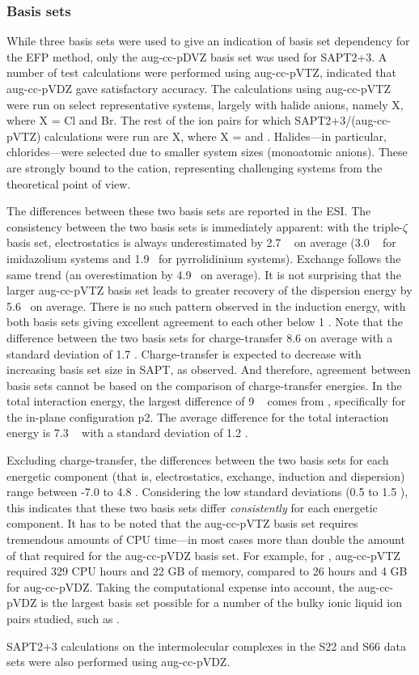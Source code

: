 \subsubsection{Basis sets}
While three basis sets were used to give an indication of basis set dependency for the EFP method, only the aug-cc-pDVZ basis set was used for SAPT2+3. 
A number of test calculations were performed using aug-cc-pVTZ, indicated that aug-cc-pVDZ gave satisfactory accuracy.
The calculations using aug-cc-pVTZ were run on select representative systems, largely with halide anions, namely X, where X = Cl and Br.
The rest of the ion pairs for which SAPT2+3/(aug-cc-pVTZ) calculations were run are X, where X = \bfl and \cl.
Halides---in particular, chlorides---were selected due to smaller system sizes (monoatomic anions). 
These are strongly bound to the cation, representing challenging systems from the theoretical point of view.
\cite{Lehmann2010a}


The differences between these two basis sets are reported in the ESI.
The consistency between the two basis sets is immediately apparent: with the triple-$\zeta$ basis set, electrostatics is always underestimated by 2.7 \enUnit~ on average (3.0 \enUnit~ for imidazolium systems and 1.9 \enUnit~for pyrrolidinium systems). 
Exchange follows the same trend (an overestimation by 4.9 \enUnit~on average).
It is not surprising that the larger aug-cc-pVTZ basis set leads to greater recovery of the dispersion energy by 5.6 \enUnit~on average.
There is no such pattern observed in the induction energy, with both basis sets giving excellent agreement to each other below 1 \enUnit.
Note that the difference between the two basis sets for charge-transfer 8.6 \enUnit on average with a standard deviation of 1.7 \enUnit.
Charge-transfer is expected to decrease with increasing basis set size in SAPT, as observed. 
And therefore, agreement between basis sets cannot be based on the comparison of charge-transfer energies.
In the total interaction energy, the largest difference of 9 \enUnit~ comes from , specifically for the in-plane configuration p2.
The average difference for the total interaction energy is 7.3 \enUnit~ with a standard deviation of 1.2 \enUnit.

Excluding charge-transfer, the differences between the two basis sets for each energetic component (that is, electrostatics, exchange, induction and dispersion) range between -7.0 to 4.8 \enUnit.
Considering the low standard deviations  (0.5 to 1.5 \enUnit), this indicates that these two basis sets differ \emph{consistently} for each energetic component. 
It has to be noted that the aug-cc-pVTZ basis set requires tremendous amounts of CPU time---in most cases more than double the amount of that required for the aug-cc-pVDZ basis set.
For example, for , aug-cc-pVTZ required 329 CPU hours and 22 GB of memory, compared to 26  hours and 4 GB for aug-cc-pVDZ. Taking the computational expense into account, the aug-cc-pVDZ is the largest basis set possible for a number of the bulky ionic liquid ion pairs studied, such as .

SAPT2+3 calculations on the intermolecular complexes in the S22 and S66 data sets 
\cite{Jurecka2006a, Takatani2010a, Rezac2011a}
were also performed using aug-cc-pVDZ.
